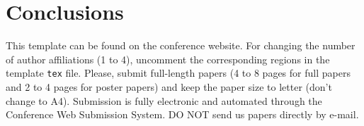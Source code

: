 \documentclass[twoside,a4paper]{article}
\begin{document}
%
%
%
%
%
%
%

\section{Conclusions}

This template can be found on the conference website. For changing the number
of author affiliations (1 to 4), uncomment the corresponding regions in the
template \texttt{tex} file. Please, submit full-length papers (4 to 8 pages
for full papers and 2 to 4 pages for poster papers) and keep the paper size to
letter (don't change to A4). Submission is fully electronic and automated 
through the Conference Web Submission System. DO NOT send us papers directly by 
e-mail.

%

\nocite{*}

%
%
%
\end{document}
